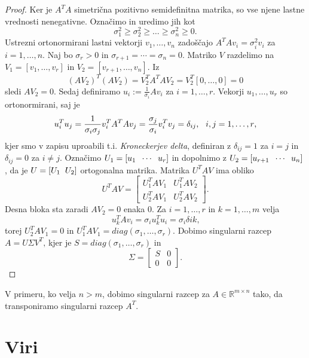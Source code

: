 \documentclass[mat1]{article}
\begin{document}
\begin{proof}
Ker je $A^TA$ simetrična pozitivno semidefinitna matrika, so vse njene lastne vrednosti nenegativne. Označimo in uredimo jih kot
$$\sigma_1^2 \geq \sigma_2^2 \geq \ldots \geq \sigma_n^2 \geq 0 \text{.}$$
Ustrezni ortonormirani lastni vektorji $v_1, \ldots, v_n$ zadoščajo
$A^T A v_i = \sigma_i^2 v_i$ za $i = 1, \ldots, n \text{.}$
Naj bo $\sigma_r > 0$ in $\sigma_{r+1} = \cdots = \sigma_n = 0 \text{.}$
Matriko $V$ razdelimo na $V_1 = 
\left[ v_1, \ldots, v_r
\right]$ in $V_2 = 
\left[ v_{r+1}, \ldots, v_n
\right] \text{.}$ Iz
$$ (AV_2)^T (AV_2) = V_2^T A^T A V_2 = V_2^T \left[ 0, \ldots, 0 \right] = 0
$$
sledi $AV_2 = 0 \text{.}$ Sedaj definiramo $u_i := \frac{1}{\sigma_i} Av_i$ za $i = 1, \ldots, r \text{.}$
Vekorji $u_1, \ldots, u_r$ so ortonormirani, saj je
$$ u_i^T u_j = \frac{1}{\sigma_i \sigma_j} v_i^T A^T A v_j = \frac{\sigma_j}{\sigma_i} v_i^T v_j = \delta_{ij} \text{,} \hspace{3mm} i,j = 1, \ldots, r \text{,}
$$
kjer smo v zapisu uproabili t.i. \emph{Kroneckerjev delta}, definiran z $\delta_{ij} = 1$ za $i = j$ in $\delta_{ij} = 0$ za $i \neq j$. Označimo 
$U_1 = 
\left[ u_1 \hspace{2mm} \cdots \hspace{2mm} u_r
\right]$ in dopolnimo z $U_2 = 
\left[ u_{r+1} \hspace{2mm} \cdots \hspace{2mm} u_n
\right]$, da je $ U = \left[ U_1 \hspace{2mm} U_2 \right]$ ortogonalna matrika. Matrika $U^T A V$ ima obliko 
$$
U^T A V = 
\begin{bmatrix} 
U_1^T A V_1 & U_1^T A V_2 \\
U_2^T A V_1 & U_2^T A V_2
\end{bmatrix}
\text{.}
$$
Desna bloka sta zaradi $AV_2 = 0$ enaka $0$. Za $i = 1, \ldots, r$ in $k = 1, \ldots, m$ velja
$$ u_k^T A v_i = \sigma_i u_k^T u_i = \sigma_i \delta{ik} \text{,}
$$
torej $U_2^T A V_1 = 0$ in $U_1^T A V_1 = diag(\sigma_1, \ldots, \sigma_r) \text{.}$ Dobimo singularni razcep $A = U \Sigma V^T \text{,}$ kjer je $S = diag(\sigma_1, \ldots, \sigma_r)$ in 
$$ \Sigma = 
\begin{bmatrix} 
S & 0 \\
0 & 0
\end{bmatrix}
\text{.}$$

\end{proof}
V primeru, ko velja $n>m$, dobimo singularni razcep za $A \in \mathbb{R}^{m \times n}$ tako, da transponiramo singularni razcep $A^T$.
\section{Viri}
\end{document}
